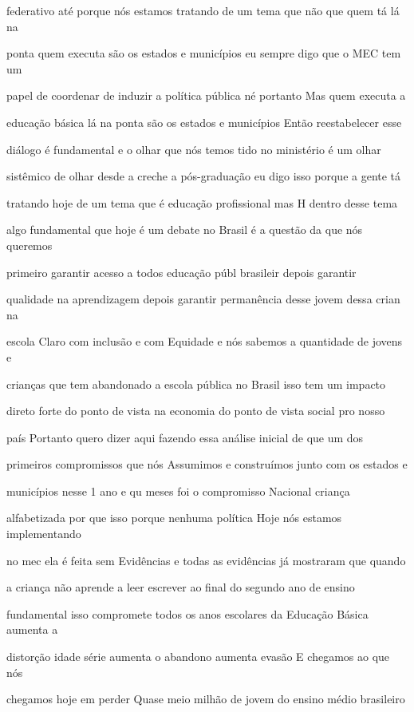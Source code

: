 \documentclass[a4paper,12pt]{article}
\begin{document}
federativo até porque nós estamos tratando de um tema que não que quem tá lá na

ponta quem executa são os estados e municípios eu sempre digo que o MEC tem um

papel de coordenar de induzir a política pública né portanto Mas quem executa a

educação básica lá na ponta são os estados e municípios Então reestabelecer esse

diálogo é fundamental e o olhar que nós temos tido no ministério é um olhar

sistêmico de olhar desde a creche a pós-graduação eu digo isso porque a gente tá

tratando hoje de um tema que é educação profissional mas H dentro desse tema

algo fundamental que hoje é um debate no Brasil é a questão da que nós queremos

primeiro garantir acesso a todos educação públ brasileir depois garantir

qualidade na aprendizagem depois garantir permanência desse jovem dessa crian na

escola Claro com inclusão e com Equidade e nós sabemos a quantidade de jovens e

crianças que tem abandonado a escola pública no Brasil isso tem um impacto

direto forte do ponto de vista na economia do ponto de vista social pro nosso

país Portanto quero dizer aqui fazendo essa análise inicial de que um dos

primeiros compromissos que nós Assumimos e construímos junto com os estados e

municípios nesse 1 ano e qu meses foi o compromisso Nacional criança

alfabetizada por que isso porque nenhuma política Hoje nós estamos implementando

no mec ela é feita sem Evidências e todas as evidências já mostraram que quando

a criança não aprende a leer escrever ao final do segundo ano de ensino

fundamental isso compromete todos os anos escolares da Educação Básica aumenta a

distorção idade série aumenta o abandono aumenta evasão E chegamos ao que nós

chegamos hoje em perder Quase meio milhão de jovem do ensino médio brasileiro
\end{document}
